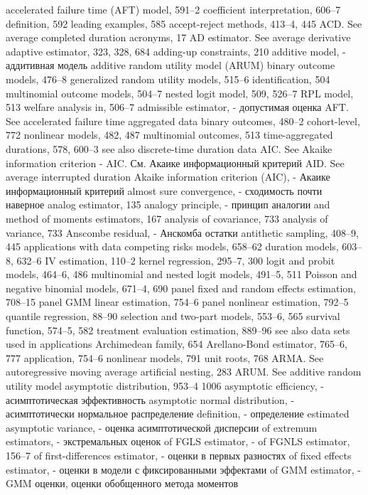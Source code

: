 accelerated failure time (AFT) model, 591–2 coefficient interpretation, 606–7 definition, 592
leading examples, 585
accept-reject methods, 413–4, 445 ACD. See average completed duration acronyms, 17
AD estimator. See average derivative adaptive estimator, 323, 328, 684 adding-up constraints, 210
additive model, - аддитивная модель
additive random utility model (ARUM)
binary outcome models, 476–8 generalized random utility models, 515–6 identification, 504
multinomial outcome models, 504–7 nested logit model, 509, 526–7
RPL model, 513
welfare analysis in, 506–7
admissible estimator, - допустимая оценка
AFT. See accelerated failure time aggregated data
binary outcomes, 480–2
cohort-level, 772
nonlinear models, 482, 487 multinomial outcomes, 513 time-aggregated durations, 578, 600–3 see also discrete-time duration data
AIC. See Akaike information criterion - AIC. См. Акаике информационный критерий
AID. See average interrupted duration
Akaike information criterion (AIC), - Акаике информационный критерий
almost sure convergence, - сходимость почти наверное 
analog estimator, 135
analogy principle, - принцип аналогии
and method of moments estimators, 167 analysis of covariance, 733
analysis of variance, 733
Anscombe residual, - Анскомба остатки
antithetic sampling, 408–9, 445 applications with data
competing risks models, 658–62
duration models, 603–8, 632–6
IV estimation, 110–2
kernel regression, 295–7, 300
logit and probit models, 464–6, 486
multinomial and nested logit models, 491–5, 511 Poisson and negative binomial models, 671–4, 690 panel fixed and random effects estimation, 708–15 panel GMM linear estimation, 754–6
panel nonlinear estimation, 792–5 quantile regression, 88–90
selection and two-part models, 553–6, 565 survival function, 574–5, 582
treatment evaluation estimation, 889–96
see also data sets used in applications Archimedean family, 654 Arellano-Bond estimator, 765–6, 777
application, 754–6 nonlinear models, 791 unit roots, 768
ARMA. See autoregressive moving average artificial nesting, 283
ARUM. See additive random utility model asymptotic distribution, 953–4
1006
asymptotic efficiency, - асимптотическая эффективность
asymptotic normal distribution, - асимптотически нормальное распределение
definition, - определение
estimated asymptotic variance, - оценка асимптотической дисперсии
of extremum estimators, - экстремальных оценок
of FGLS estimator, - 
of FGNLS estimator, 156–7
of first-differences estimator, - оценки в первых разностях
of fixed effects estimator, - оценки в модели с фиксированными эффектами
of GMM estimator, - GMM оценки, оценки обобщенного метода моментов
